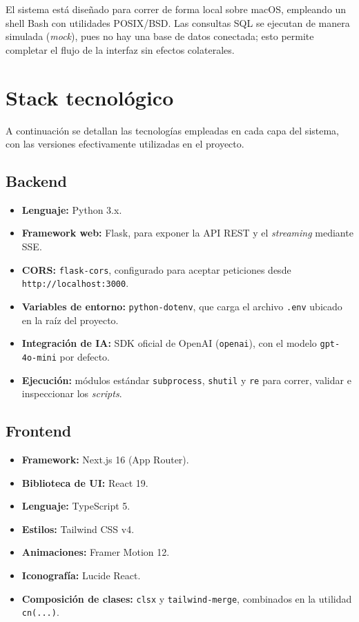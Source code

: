\documentclass[12pt,a4paper]{article}
\begin{document}
El sistema está diseñado para correr de forma local sobre macOS, empleando un
shell Bash con utilidades POSIX/BSD. Las consultas SQL se ejecutan de manera
simulada (\textit{mock}), pues no hay una base de datos conectada; esto permite
completar el flujo de la interfaz sin efectos colaterales.

\section{Stack tecnológico}

A continuación se detallan las tecnologías empleadas en cada capa del sistema,
con las versiones efectivamente utilizadas en el proyecto.

\subsection{Backend}

\begin{itemize}
    \item \textbf{Lenguaje:} Python 3.x.
    \item \textbf{Framework web:} Flask, para exponer la API REST y el
    \textit{streaming} mediante SSE.
    \item \textbf{CORS:} \texttt{flask-cors}, configurado para aceptar
    peticiones desde \texttt{http://localhost:3000}.
    \item \textbf{Variables de entorno:} \texttt{python-dotenv}, que carga el
    archivo \texttt{.env} ubicado en la raíz del proyecto.
    \item \textbf{Integración de IA:} SDK oficial de OpenAI (\texttt{openai}),
    con el modelo \texttt{gpt-4o-mini} por defecto.
    \item \textbf{Ejecución:} módulos estándar \texttt{subprocess},
    \texttt{shutil} y \texttt{re} para correr, validar e inspeccionar los
    \textit{scripts}.
\end{itemize}

\subsection{Frontend}

\begin{itemize}
    \item \textbf{Framework:} Next.js 16 (App Router).
    \item \textbf{Biblioteca de UI:} React 19.
    \item \textbf{Lenguaje:} TypeScript 5.
    \item \textbf{Estilos:} Tailwind CSS v4.
    \item \textbf{Animaciones:} Framer Motion 12.
    \item \textbf{Iconografía:} Lucide React.
    \item \textbf{Composición de clases:} \texttt{clsx} y \texttt{tailwind-merge},
    combinados en la utilidad \texttt{cn(...)}.
\end{itemize}
\end{document}
